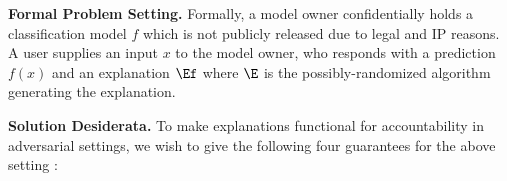 



\textbf{Formal Problem Setting.} Formally, a model owner confidentially holds a classification model $f$ which is not publicly released due to legal and IP reasons. A user supplies an input $x$ to the model owner, who responds with a prediction $f(x)$ and an explanation $\Ef$  where $\E$ is the possibly-randomized algorithm generating the explanation.%

\textbf{Solution Desiderata.} To make explanations functional for accountability in adversarial settings, we wish to give the following four guarantees for the above setting :

